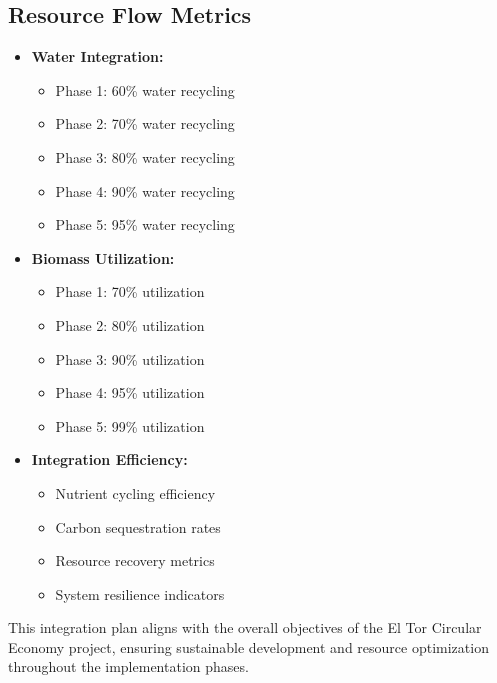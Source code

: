 \subsection{Resource Flow Metrics}
\begin{itemize}
    \item \textbf{Water Integration:}
    \begin{itemize}
        \item Phase 1: 60\% water recycling
        \item Phase 2: 70\% water recycling
        \item Phase 3: 80\% water recycling
        \item Phase 4: 90\% water recycling
        \item Phase 5: 95\% water recycling
    \end{itemize}
    \item \textbf{Biomass Utilization:}
    \begin{itemize}
        \item Phase 1: 70\% utilization
        \item Phase 2: 80\% utilization
        \item Phase 3: 90\% utilization
        \item Phase 4: 95\% utilization
        \item Phase 5: 99\% utilization
    \end{itemize}
    \item \textbf{Integration Efficiency:}
    \begin{itemize}
        \item Nutrient cycling efficiency
        \item Carbon sequestration rates
        \item Resource recovery metrics
        \item System resilience indicators
    \end{itemize}
\end{itemize}

This integration plan aligns with the overall objectives of the El Tor Circular Economy project, ensuring sustainable development and resource optimization throughout the implementation phases.
